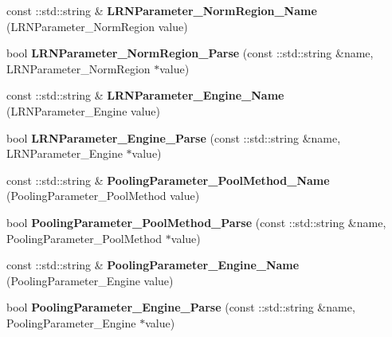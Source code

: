 \begin{DoxyCompactItemize}
\item 
\mbox{\label{namespacecaffe_a198a0c80ab39c8294d1d607db9662514}} 
const \+::std\+::string \& {\bfseries L\+R\+N\+Parameter\+\_\+\+Norm\+Region\+\_\+\+Name} (L\+R\+N\+Parameter\+\_\+\+Norm\+Region value)
\item 
\mbox{\label{namespacecaffe_a3c201c57335da0ede7db38aff25bfa40}} 
bool {\bfseries L\+R\+N\+Parameter\+\_\+\+Norm\+Region\+\_\+\+Parse} (const \+::std\+::string \&name, L\+R\+N\+Parameter\+\_\+\+Norm\+Region $\ast$value)
\item 
\mbox{\label{namespacecaffe_aa6bd56a7182581ec144e46e09d8d66f7}} 
const \+::std\+::string \& {\bfseries L\+R\+N\+Parameter\+\_\+\+Engine\+\_\+\+Name} (L\+R\+N\+Parameter\+\_\+\+Engine value)
\item 
\mbox{\label{namespacecaffe_ae88676b0208de85b83b36e88b07ebc2e}} 
bool {\bfseries L\+R\+N\+Parameter\+\_\+\+Engine\+\_\+\+Parse} (const \+::std\+::string \&name, L\+R\+N\+Parameter\+\_\+\+Engine $\ast$value)
\item 
\mbox{\label{namespacecaffe_a376139c71ce161b7bed318cc537b3f46}} 
const \+::std\+::string \& {\bfseries Pooling\+Parameter\+\_\+\+Pool\+Method\+\_\+\+Name} (Pooling\+Parameter\+\_\+\+Pool\+Method value)
\item 
\mbox{\label{namespacecaffe_a898120bd068eea2d340be222acee88bf}} 
bool {\bfseries Pooling\+Parameter\+\_\+\+Pool\+Method\+\_\+\+Parse} (const \+::std\+::string \&name, Pooling\+Parameter\+\_\+\+Pool\+Method $\ast$value)
\item 
\mbox{\label{namespacecaffe_a55b7d53c00723b52b7ec8ca71659ec0d}} 
const \+::std\+::string \& {\bfseries Pooling\+Parameter\+\_\+\+Engine\+\_\+\+Name} (Pooling\+Parameter\+\_\+\+Engine value)
\item 
\mbox{\label{namespacecaffe_aa5a4edb40badd1134b447dc37756b4e7}} 
bool {\bfseries Pooling\+Parameter\+\_\+\+Engine\+\_\+\+Parse} (const \+::std\+::string \&name, Pooling\+Parameter\+\_\+\+Engine $\ast$value)
\item 
\mbox{\label{namespacecaffe_a5208e5f3b39c8f5b7abf73a1b64f7da6}} 

\end{DoxyCompactItemize}
